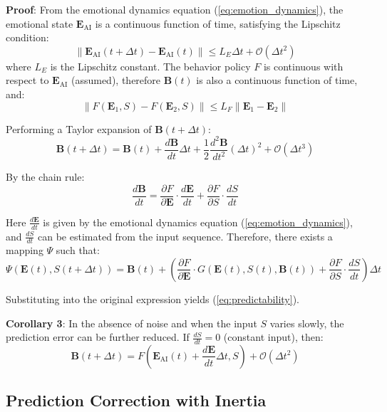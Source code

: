 \documentclass[12pt,a4paper]{article}
\theoremstyle{plain}
\newcommand{\ve}[1]{\bm{#1}}                    %
\newcommand{\Evec}{\ve{E}}                        %
\newcommand{\Bvec}{\ve{B}}                        %
\begin{document}
\textbf{Proof}: From the emotional dynamics equation (\ref{eq:emotion_dynamics}), the emotional state $\Evec_{\text{AI}}$ is a continuous function of time, satisfying the Lipschitz condition:
\begin{equation}
\| \Evec_{\text{AI}}(t+\Delta t) - \Evec_{\text{AI}}(t) \| \leq L_E \Delta t + \mathcal{O}(\Delta t^2)
\end{equation}
where $L_E$ is the Lipschitz constant. The behavior policy $F$ is continuous with respect to $\Evec_{\text{AI}}$ (assumed), therefore $\Bvec(t)$ is also a continuous function of time, and:
\begin{equation}
\| F(\Evec_1, S) - F(\Evec_2, S) \| \leq L_F \| \Evec_1 - \Evec_2 \|
\end{equation}

Performing a Taylor expansion of $\Bvec(t+\Delta t)$:
\begin{equation}
\Bvec(t+\Delta t) = \Bvec(t) + \frac{d\Bvec}{dt} \Delta t + \frac{1}{2} \frac{d^2\Bvec}{dt^2} (\Delta t)^2 + \mathcal{O}(\Delta t^3)
\end{equation}

By the chain rule:
\begin{equation}
\frac{d\Bvec}{dt} = \frac{\partial F}{\partial \Evec} \cdot \frac{d\Evec}{dt} + \frac{\partial F}{\partial S} \cdot \frac{dS}{dt}
\end{equation}

Here $\frac{d\Evec}{dt}$ is given by the emotional dynamics equation (\ref{eq:emotion_dynamics}), and $\frac{dS}{dt}$ can be estimated from the input sequence. Therefore, there exists a mapping $\Psi$ such that:
\begin{equation}
\Psi(\Evec(t), S(t+\Delta t)) = \Bvec(t) + \left( \frac{\partial F}{\partial \Evec} \cdot G(\Evec(t), S(t), \Bvec(t)) + \frac{\partial F}{\partial S} \cdot \frac{dS}{dt} \right) \Delta t
\end{equation}

Substituting into the original expression yields (\ref{eq:predictability}).

\textbf{Corollary 3}: In the absence of noise and when the input $S$ varies slowly, the prediction error can be further reduced. If $\frac{dS}{dt} = 0$ (constant input), then:
\begin{equation}
\Bvec(t+\Delta t) = F\left( \Evec_{\text{AI}}(t) + \frac{d\Evec}{dt} \Delta t, S \right) + \mathcal{O}(\Delta t^2)
\end{equation}

\subsection{Prediction Correction with Inertia}
\end{document}
